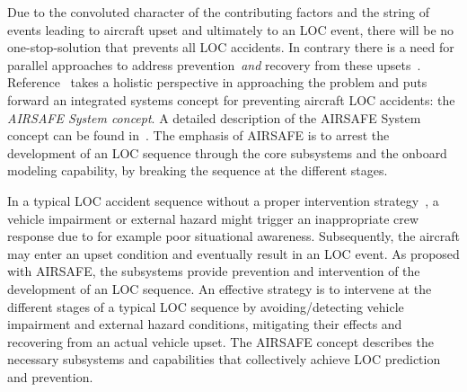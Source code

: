 \documentclass[letter,onecolumn,12pt]{aiaa-tc}
\begin{document}
Due to the convoluted character of the contributing factors and the string of events leading to aircraft upset and ultimately to an LOC event, there will be no one-stop-solution that prevents all LOC accidents. In contrary there is a need for parallel approaches to address prevention~\emph{and} recovery from these upsets~\cite{MST08_upsets}. Reference~\cite{LOC10_Belcastro_concept} takes a holistic perspective in approaching the problem and puts forward an integrated systems concept for preventing aircraft LOC accidents: the \emph{AIRSAFE System concept}. A detailed description of the AIRSAFE System concept can be found in~\cite{AIRSAFE_part1}.
The emphasis of AIRSAFE is to arrest the development of an LOC sequence through the core subsystems and the onboard modeling capability, by breaking the sequence at the different stages.




In a typical LOC accident sequence without a proper intervention strategy~\cite{LOC10_Belcastro_concept}, a vehicle impairment or external hazard might trigger an inappropriate crew response due to for example poor situational awareness. Subsequently, the aircraft may enter an upset condition and eventually result in an LOC event. As proposed with AIRSAFE, the subsystems provide prevention and intervention of the development of an LOC sequence.
An effective strategy is to intervene at the different stages of a typical LOC sequence by avoiding/detecting vehicle impairment and external hazard conditions, mitigating their effects and recovering from an actual vehicle upset. The AIRSAFE concept describes the necessary subsystems and capabilities that collectively achieve LOC prediction and prevention.
\end{document}

